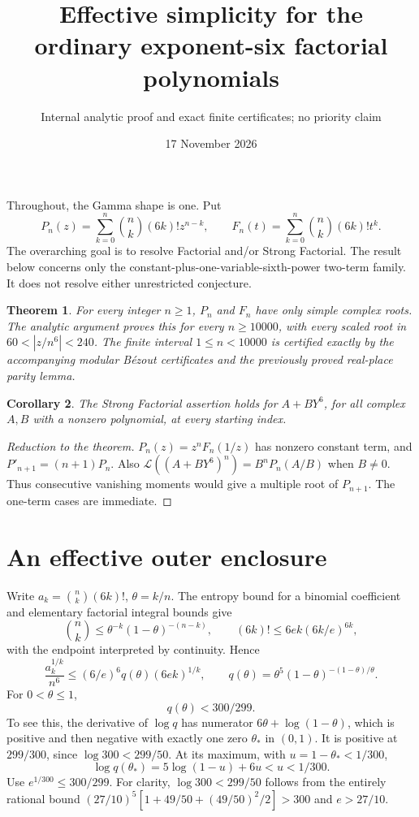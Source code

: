 \documentclass[11pt]{article}
\title{Effective simplicity for the ordinary exponent-six factorial polynomials}
\author{Internal analytic proof and exact finite certificates; no priority claim}
\date{17 November 2026}
\newtheorem{theorem}{Theorem}
\newtheorem{corollary}[theorem]{Corollary}
\begin{document}
\maketitle
Throughout, the Gamma shape is one. Put
\[
 P_n(z)=\sum_{k=0}^n\binom nk(6k)!z^{n-k},\qquad
 F_n(t)=\sum_{k=0}^n\binom nk(6k)!t^k.
\]
The overarching goal is to resolve Factorial and/or Strong Factorial.
The result below concerns only the constant-plus-one-variable-sixth-power
two-term family. It does not resolve either unrestricted conjecture.

\begin{theorem}\label{thm:main}
For every integer $n\ge1$, $P_n$ and $F_n$ have only simple complex roots.
The analytic argument proves this for every $n\ge10000$, with every
scaled root in $60<|z/n^6|<240$. The finite interval $1\le n<10000$
is certified exactly by the accompanying modular B\'ezout certificates
and the previously proved real-place parity lemma.
\end{theorem}
\begin{corollary}
The Strong Factorial assertion holds for $A+BY^6$, for all complex $A,B$
with a nonzero polynomial, at every starting index.
\end{corollary}
\begin{proof}[Reduction to the theorem]
$P_n(z)=z^nF_n(1/z)$ has nonzero constant term, and
$P'_{n+1}=(n+1)P_n$. Also
$\mathcal L((A+BY^6)^n)=B^nP_n(A/B)$ when $B\ne0$.
Thus consecutive vanishing moments would give a multiple root of
$P_{n+1}$. The one-term cases are immediate.
\end{proof}

\section{An effective outer enclosure}
Write $a_k=\binom nk(6k)!$, $\theta=k/n$. The entropy bound for a
binomial coefficient and elementary factorial integral bounds give
\[
 \binom nk\le\theta^{-k}(1-\theta)^{-(n-k)},\qquad
 (6k)!\le6ek(6k/e)^{6k},
\]
with the endpoint interpreted by continuity. Hence
\[
 \frac{a_k^{1/k}}{n^6}
 \le(6/e)^6q(\theta)(6ek)^{1/k},\qquad
 q(\theta)=\theta^5(1-\theta)^{-(1-\theta)/\theta}.       \tag{1}
\]
For $0<\theta\le1$,
\[
                          q(\theta)<300/299.           \tag{2}
\]
To see this, the derivative of $\log q$ has numerator
$6\theta+\log(1-\theta)$, which is positive and then negative with
exactly one zero $\theta_*$ in $(0,1)$. It is positive at $299/300$,
since $\log300<299/50$. At its maximum, with $u=1-\theta_*<1/300$,
\[
 \log q(\theta_*)=5\log(1-u)+6u<u<1/300.
\]
Use $e^{1/300}\le300/299$.
For clarity, $\log300<299/50$ follows from the entirely rational bound
$(27/10)^5[1+49/50+(49/50)^2/2]>300$ and $e>27/10$.
\end{document}
